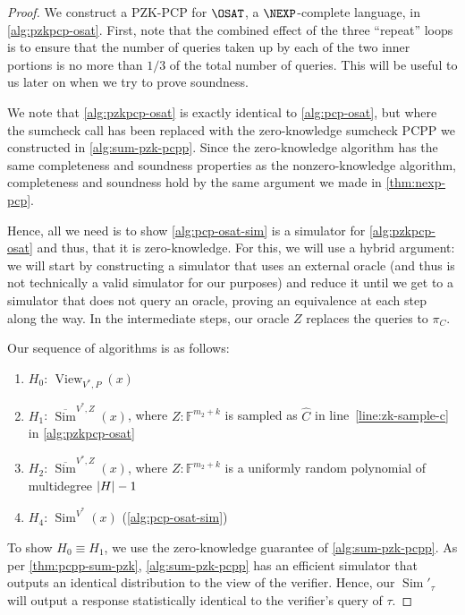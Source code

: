 \documentclass[english,12pt]{reedthesis}
\theoremstyle{plain}
\theoremstyle{definition}
\theoremstyle{remark}
\DeclareMathOperator{\Sim}{Sim}
\DeclareMathOperator{\View}{View}
\DeclarePairedDelimiter{\abs}{\lvert}{\rvert}
\begin{document}
\begin{proof}
  We construct a PZK-PCP for $\OSAT$, a $\NEXP$-complete language, in
  \cref{alg:pzkpcp-osat}. First, note that the combined effect of the three
  ``repeat'' loops is to ensure that the number of queries taken up by each of
  the two inner portions is no more than $1/3$ of the total number of queries.
  This will be useful to us later on when we try to prove soundness.

  We note that \cref{alg:pzkpcp-osat} is exactly identical to
  \cref{alg:pcp-osat}, but where the sumcheck call has been replaced with the
  zero-knowledge sumcheck PCPP we constructed in \cref{alg:sum-pzk-pcpp}. Since
  the zero-knowledge algorithm has the same completeness and soundness
  properties as the nonzero-knowledge algorithm, completeness and soundness hold
  by the same argument we made in \cref{thm:nexp-pcp}.

  Hence, all we need is to show \cref{alg:pcp-osat-sim} is a simulator for
  \cref{alg:pzkpcp-osat} and thus, that it is zero-knowledge. For this, we will use a
  hybrid argument: we will start by constructing a simulator that uses an
  external oracle (and thus is not technically a valid simulator for our
  purposes) and reduce it until we get to a simulator that does not query an
  oracle, proving an equivalence at each step along the way. In the intermediate
  steps, our oracle $Z$ replaces the queries to $\pi_{C}$.

  Our sequence of algorithms is as follows:
  \begin{enumerate}
    \item $H_{0}$: $\View_{V^{*}, P}(x)$
    \item $H_{1}$: $\overline{\Sim}^{V^{*}, Z}(x)$, where
          $Z\colon \mathbb{F}^{m_{2}+k}$ is sampled as $\hat{C}$ in
          line~\ref{line:zk-sample-c} in \cref{alg:pzkpcp-osat}
    \item $H_{2}$: $\overline{\Sim}^{V^{*}, Z}(x)$, where
          $Z\colon \mathbb{F}^{m_{2}+k}$ is a uniformly random polynomial of
          multidegree $\abs{H} - 1$
    \item $H_{4}$: $\Sim^{V^{*}}(x)$ (\cref{alg:pcp-osat-sim})
  \end{enumerate}

  To show $H_{0} \equiv H_{1}$, we use the zero-knowledge guarantee of
  \cref{alg:sum-pzk-pcpp}. As per \cref{thm:pcpp-sum-pzk},
  \cref{alg:sum-pzk-pcpp} has an efficient simulator that outputs an identical
  distribution to the view of the verifier. Hence, our $\Sim'_{\tau}$ will output
  a response statistically identical to the verifier's query of $\tau$.


\end{proof}
\end{document}
